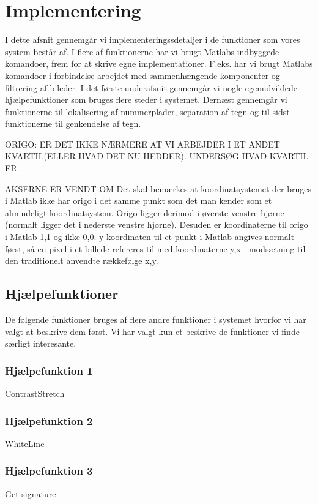 \section{Implementering}
\label{sec:implementation}

I dette afsnit gennemgår vi implementeringssdetaljer i de funktioner som vores system består af. I flere af funktionerne har vi brugt Matlabs indbyggede komandoer, frem for at skrive egne implementationer. F.eks. har vi brugt Matlabs komandoer i forbindelse arbejdet med sammenhængende komponenter og filtrering af bileder. I det første underafsnit gennemgår vi nogle egenudviklede hjælpefunktioner som bruges flere steder i systemet. Dernæst gennemgår vi funktionerne til lokalisering af nummerplader, separation af tegn og til sidst funktionerne til genkendelse af tegn.

ORIGO: ER DET IKKE NÆRMERE AT VI ARBEJDER I ET ANDET KVARTIL(ELLER HVAD DET NU HEDDER). UNDERSØG HVAD KVARTIL ER.

AKSERNE ER VENDT OM
Det skal bemærkes at koordinatsystemet der bruges i Matlab ikke har origo i det samme punkt som det man kender som et almindeligt koordinatsystem. Origo ligger derimod i øverste venstre hjørne (normalt ligger det i nederste venstre hjørne). Desuden er koordinaterne til origo i Matlab 1,1 og ikke 0,0. y-koordinaten til et punkt i Matlab angives normalt først, så en pixel i et billede refereres til med koordinaterne y,x i modsætning til den traditionelt anvendte rækkefølge x,y.


\subsection{Hjælpefunktioner}
\label{sec:imp:hjaelpefunktioner}
De følgende funktioner bruges af flere andre funktioner i systemet hvorfor vi har valgt at beskrive dem først. Vi har valgt kun et beskrive de funktioner vi finde særligt interesante.

\subsubsection{Hjælpefunktion 1}
\label{sec:imp:ContrastStrech}
ContrastStretch
\subsubsection{Hjælpefunktion 2}
WhiteLine 
\subsubsection{Hjælpefunktion 3}
\label{sec:imp:GetSignature}
Get signature
